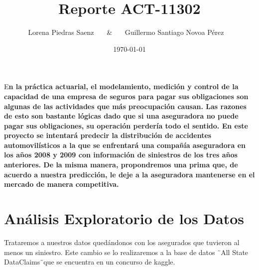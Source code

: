 \documentclass[DIV=calc, 
					paper=letter, 
					fontsize=11pt, 
					twocolumn]{scrartcl}
\title{\Huge Reporte ACT-11302} %
\author{	Lorena Piedras Saenz \ \ \ 
			\& \ \ \ 
			Guillermo Santiago Novoa P\'erez\ \ }
\date{\today} %
\newcommand{\initial}[1]{ %
\lettrine[lines=3,lhang=0.3,nindent=0em]{
\color{DarkGoldenrod}
{\textsf{#1}}}{}}
\begin{document}
\maketitle %

\thispagestyle{fancy} %


\initial{E}\textbf{n la pr\'actica actuarial, el modelamiento, medici\'on y control de la capacidad de una empresa de seguros para pagar sus obligaciones son algunas de las actividades que m\'as preocupaci\'on causan. Las razones de esto son bastante l\'ogicas dado que si una aseguradora no puede pagar sus obligaciones, su operaci\'on perder\'ia todo el sentido.  En este proyecto se intentar\'a predecir la distribuci\'on de accidentes automovil\'isticos a la que se enfrentar\'a una compa\~{n}\'ia aseguradora en los a\~{n}os 2008 y 2009 con informaci\'on de siniestros de los tres a\~{n}os anteriores. De la misma manera, propondremos una prima que, de acuerdo a nuestra predicci\'on, le deje a la aseguradora mantenerse en el mercado de manera competitiva.}


\section{An\'alisis Exploratorio de los Datos}

\indent Trataremos a nuestros datos qued\'andonos con los asegurados que tuvieron al menos un siniestro. Este cambio se lo realizaremos a la base de datos \" \ All State DataClaims\" \ que se encuentra en un concurso de kaggle.
\end{document}
